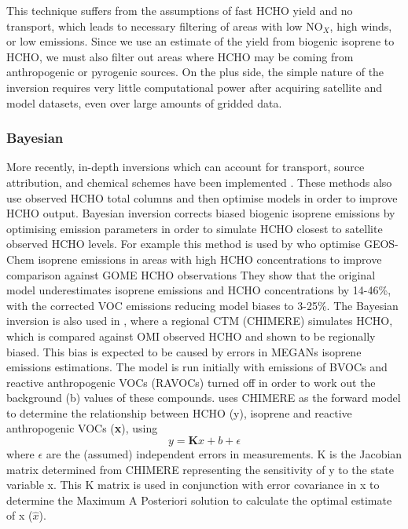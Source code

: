       This technique suffers from the assumptions of fast HCHO yield and no transport, which leads to necessary filtering of areas with low NO$_X$, high winds, or low emissions.
      Since we use an estimate of the yield from biogenic isoprene to HCHO, we must also filter out areas where HCHO may be coming from anthropogenic or pyrogenic sources.
      On the plus side, the simple nature of the inversion requires very little computational power after acquiring satellite and model datasets, even over large amounts of gridded data.
      
      
    
    \subsubsection{Bayesian}
      
      More recently, in-depth inversions which can account for transport, source attribution, and chemical schemes have been implemented \parencite{FortemsCheiney2012}.
      These methods also use observed HCHO total columns and then optimise models in order to improve HCHO output.
      Bayesian inversion corrects biased biogenic isoprene emissions by optimising emission parameters in order to simulate HCHO closest to satellite observed HCHO levels.
      For example this method is used by \textcite{Shim2005} who optimise GEOS-Chem isoprene emissions in areas with high HCHO concentrations to improve comparison against GOME HCHO observations %
      They show that the original model underestimates isoprene emissions and HCHO concentrations by 14-46\%, with the corrected VOC emissions reducing model biases to 3-25\%.
      The Bayesian inversion is also used in \textcite{Curci2010}, where a regional CTM (CHIMERE) simulates HCHO, which is compared against OMI observed HCHO and shown to be regionally biased.
      This bias is expected to be caused by errors in MEGANs isoprene emissions estimations.
      The model is run initially with emissions of BVOCs and reactive anthropogenic VOCs (RAVOCs) turned off in order to work out the background (b) values of these compounds.
      \textcite{Curci2010} uses CHIMERE as the forward model to determine the relationship between HCHO (y), isoprene and reactive anthropogenic VOCs (\textbf{x}), using 
      \begin{equation}
        y=\mathbf{K}x + b + \epsilon
      \end{equation}
      where $\epsilon$ are the (assumed) independent errors in measurements.
      K is the Jacobian matrix determined from CHIMERE representing the sensitivity of y to the state variable x.
      This K matrix is used in conjunction with error covariance in x to determine the Maximum A Posteriori solution to calculate the optimal estimate of x ($\hat{x}$).
    
